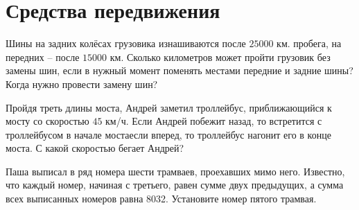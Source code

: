 \section{Средства передвижения}
\begin{itemize}

\itA Шины на задних колёсах грузовика изнашиваются после $25 000$ км. пробега, на передних -- после $15 000$ км. Сколько километров может пройти грузовик без замены шин, если в нужный момент поменять местами передние и задние шины? Когда нужно провести замену шин?

\itB Пройдя треть длины моста, Андрей заметил троллейбус, приближающийся к мосту со скоростью $45$ км/ч. Если Андрей побежит назад, то встретится с троллейбусом в начале моста\scolon если вперед, то троллейбус нагонит его в конце моста. С какой скоростью бегает Андрей?

\itC Паша выписал в ряд номера шести трамваев, проехавших мимо него. Известно, что каждый номер, начиная с третьего, равен сумме двух предыдущих, а сумма всех выписанных номеров равна 8032. Установите номер пятого трамвая.
\end{itemize}